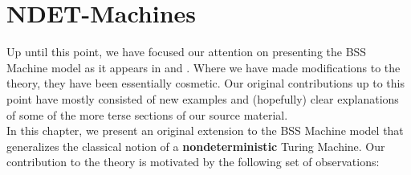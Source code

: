 \chapter{NDET-Machines}
\label{chap:ndet}

Up until this point, we have focused our attention on presenting the
BSS Machine model as it appears in \cite{B89} and \cite{B98}.  Where
we have made modifications to the theory, they have been essentially
cosmetic.  Our original contributions up to this point have mostly
consisted of new examples and (hopefully) clear explanations of some
of the more terse sections of our source material.\\

In this chapter, we present an original extension to the BSS Machine
model that generalizes the classical notion of a
\textbf{nondeterministic} Turing Machine.  Our contribution to the
theory is motivated by the following set of observations:


